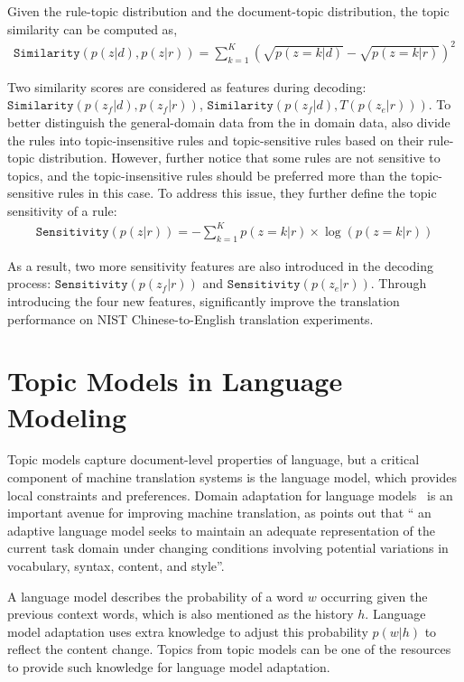 Given the rule-topic distribution and the document-topic distribution, the topic similarity can be computed as,
\begin{align}
\texttt{Similarity}(p(z|d), p(z|r)) = \sum_{k=1}^{K} (\sqrt{p(z=k|d)} - \sqrt{p(z=k|r)})^2
\end{align}

Two similarity scores are considered as features during decoding: $\texttt{Similarity}(p(z_f|d), p(z_f|r))$, $\texttt{Similarity}(p(z_f|d), T(p(z_e|r)))$. To better distinguish the general-domain data from the in domain data, \citet{xiao-12} also divide the rules into topic-insensitive rules and topic-sensitive rules based on their rule-topic distribution. However, \citet{xiao-12} further notice that some rules are not sensitive to topics, and the topic-insensitive rules should be preferred more than the topic-sensitive rules in this case. To address this issue, they further define the topic sensitivity of a rule:
\begin{align}
\texttt{Sensitivity}(p(z|r)) = - \sum_{k=1}^{K} p(z=k|r) \times \log(p(z=k|r))
\end{align}

As a result, two more sensitivity features are also introduced in the decoding process: $\texttt{Sensitivity}(p(z_f|r))$ and $\texttt{Sensitivity}(p(z_e|r))$. Through introducing the four new features, \citet{xiao-12} significantly improve the translation performance on NIST Chinese-to-English translation experiments.

\section{Topic Models in Language Modeling}

Topic models capture document-level properties of language, but a critical component of machine translation systems is the language model, which provides local constraints and preferences. Domain adaptation for language models~\citep{Bellegarda-04,wood-09} is an important avenue for improving machine translation, as \citet{Bellegarda-04} points out that `` an adaptive language model seeks to maintain an adequate representation of the current task domain under changing conditions involving potential variations in vocabulary, syntax, content, and style''.

A language model describes the probability of a word $w$ occurring given the previous context words, which is also mentioned as the history $h$. Language model adaptation uses extra knowledge to adjust this probability $p(w|h)$ to reflect the content change. Topics from topic models can be one of the resources to provide such knowledge for language model adaptation.

